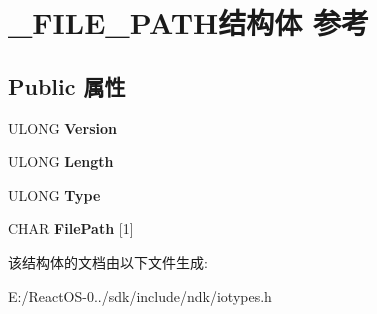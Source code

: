 \hypertarget{struct___f_i_l_e___p_a_t_h}{}\section{\+\_\+\+F\+I\+L\+E\+\_\+\+P\+A\+T\+H结构体 参考}
\label{struct___f_i_l_e___p_a_t_h}
\subsection*{Public 属性}
\begin{DoxyCompactItemize}
\item 
\mbox{\label{struct___f_i_l_e___p_a_t_h_a6f49bf0bd5134825ccd32ef835cd9efc}} 
U\+L\+O\+NG {\bfseries Version}
\item 
\mbox{\label{struct___f_i_l_e___p_a_t_h_aa26d82335aac7173265fff25e9e0f17f}} 
U\+L\+O\+NG {\bfseries Length}
\item 
\mbox{\label{struct___f_i_l_e___p_a_t_h_a2d9380b2ea63661cf622a90c7659618f}} 
U\+L\+O\+NG {\bfseries Type}
\item 
\mbox{\label{struct___f_i_l_e___p_a_t_h_a332f42aee7a1998095fac8cf36945025}} 
C\+H\+AR {\bfseries File\+Path} \mbox{[}1\mbox{]}
\end{DoxyCompactItemize}


该结构体的文档由以下文件生成\+:\begin{DoxyCompactItemize}
\item 
E\+:/\+React\+O\+S-\/0../sdk/include/ndk/iotypes.\+h\end{DoxyCompactItemize}
